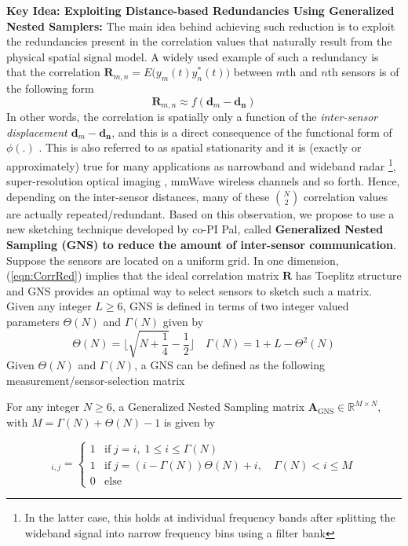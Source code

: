 {\bf Key Idea: Exploiting Distance-based Redundancies Using Generalized Nested Samplers:} The main idea behind achieving such reduction is to exploit the redundancies present in the correlation values that naturally result from the physical spatial signal model. A widely used example of such a redundancy is that the correlation $\mathbf{R}_{m,n} = E\Big(y_m(t)y^*_n(t)\Big)$ between $m$th and $n$th sensors is of the following form \begin{equation} \mathbf{R}_{m,n} \approx f(\mathbf{d}_m - \mathbf{d_n}) \label{eqn:CorrRed}\end{equation}
In other words, the correlation is spatially only a function of the {\em inter-sensor displacement $\mathbf{d}_m - \mathbf{d_n}$}, and this is a direct consequence of the functional form of $\phi(.)$ . This is also referred to as spatial stationarity and it is (exactly or approximately) true for many applications as narrowband and wideband radar \footnote{In the latter case, this holds at individual frequency bands after splitting the wideband signal into narrow frequency bins using a filter bank}, super-resolution optical imaging \cite{}, mmWave wireless channels \cite{} and so forth. Hence, depending on the inter-sensor distances, many of these $N\choose 2$ correlation values are actually repeated/redundant. Based on this observation, we propose to use a new sketching technique developed by co-PI Pal, called {\bf Generalized Nested Sampling (GNS) to reduce the amount of inter-sensor communication}. Suppose the sensors are located on a uniform grid. In one dimension, (\ref{eqn:CorrRed}) implies that the ideal correlation matrix $\mathbf{R}$ has Toeplitz structure and GNS provides an optimal way to select sensors to sketch such a matrix. Given any integer $L\ge 6$, GNS is defined in terms of two integer valued parameters $\Theta(N)$ and $\Gamma(N)$ given by
\begin{equation} \Theta(N) = \lfloor \sqrt{N + \frac{1}{4}} - \frac{1}{2} \rfloor \quad 
\Gamma(N)=1+L-{\Theta}^2(N) 
\end{equation}
Given $\Theta(N)$ and $\Gamma(N)$, a GNS can be defined as the following measurement/sensor-selection matrix
\begin{definition} For any integer $N \ge 6$, a Generalized Nested Sampling matrix $\mathbf{A}_{\text{GNS}} \in \mathbb{R}^{M \times N}$, with $M = \Gamma(N) + \Theta(N) - 1$ is given by 

\begin{equation}
 [\mathbf{A}_{\text{GNS}}]_{i,j}= \begin{cases}  1 & \textrm{if} \; j = i,\; 1 \le i \le \Gamma(N) \\
1 & \textrm{if} \; j=(i-\Gamma(N))\Theta(N)+i, \quad \Gamma(N) < i \le M  \\
0 &  \text{else}
\end{cases}
\label{def_A}
\end{equation}
\end{definition}
